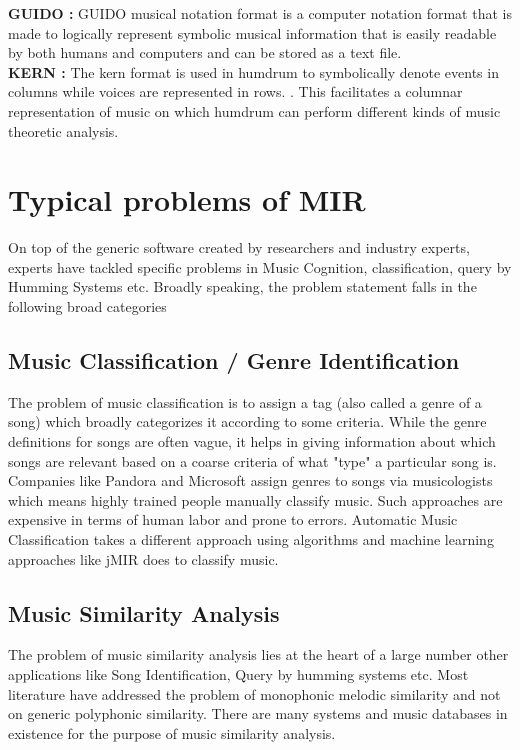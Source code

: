 \noindent \textbf{GUIDO :} GUIDO musical notation format is a computer notation format that is made to logically represent symbolic musical information that is easily readable by both humans and computers and can be stored as a text file. \\

\noindent \textbf{KERN :} The kern format \cite{humdrumkern} is used in humdrum to symbolically denote events in columns while voices are represented in rows. \cite{humdrum}. This facilitates a columnar representation of music on which humdrum can perform  different kinds of music theoretic analysis. 

\section{Typical problems of MIR}

\noindent On top of the generic software created by researchers and industry experts, experts have tackled specific problems in Music Cognition\cite{musiccog}, classification\cite{jMIR}, query by Humming Systems \cite{shazam} etc. Broadly speaking, the problem statement falls in the following broad categories

\subsection{Music Classification / Genre Identification}

\noindent The problem of music classification is to assign a tag (also called a genre of a song) which broadly categorizes it according to some criteria. While the genre definitions for songs are often vague, it helps in giving information about which songs are relevant based on a coarse criteria of what "type" a particular song is. Companies like Pandora and Microsoft assign genres to songs via musicologists \cite{genreclassification} which means highly trained people manually classify music. Such approaches are expensive in terms of human labor and prone to errors. Automatic Music Classification takes a different approach using algorithms and machine learning approaches like jMIR \cite{jMIR} does to classify music. 

\subsection{Music Similarity Analysis}

\noindent The problem of music similarity analysis lies at the heart of a large number other applications like Song Identification, Query by humming systems etc. Most literature have addressed the problem of monophonic melodic similarity \cite{simsurvey} and not on generic polyphonic similarity. There are many systems \cite{similie} and music databases in existence \cite{humdrumkern} for the purpose of music similarity analysis.

